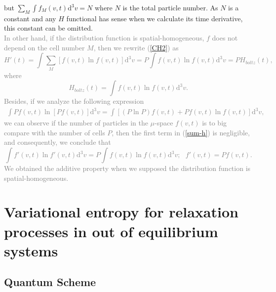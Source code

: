 \documentclass{article}
\begin{document}
  but $\sum_M \int f_M(v,t)\mathrm{d}^3v =N$ where $N$ is the total particle number. As $N$ is a constant and any $H$ functional has sense when we calculate its time derivative, this constant can be omitted. \\
  \textcolor{gray}{In other hand, if the distribution function is spatial-homogeneous, $f$ does not depend on the cell number $M$, then we rewrite (\ref{CH2}) as
  \begin{equation}
      H'(t)=\int \sum_M [f(v,t)\ln f(v,t)] \mathrm{d}^{3}v = P\int  f(v,t) \ln f(v,t) \mathrm{d}^{3}v= P H_{boltz}(t), 
  \end{equation}
  where
  \begin{equation}
      H_{boltz}(t)=\int  f(v,t) \ln f(v,t) \mathrm{d}^{3}v.
  \end{equation}
  Besides, if we analyze the following expression
  \begin{eqnarray}
      \int Pf(v,t) \ln [Pf(v,t)] \mathrm{d}^{3}v = \int [(P\ln P)f(v,t) + Pf(v,t) \ln f(v,t)]\mathrm{d}^{3}v, \label{sum-h}
  \end{eqnarray}
  we can observe if the number of particles in the $\mu$-space $f(v,t)$ is to big compare with the number of cells $P$, then the first term in (\ref{sum-h}) is negligible, and consequently, we conclude that
  \begin{equation}
      \int f'(v,t) \ln f'(v,t) \mathrm{d}^{3}v = P\int f(v,t) \ln f(v,t) \mathrm{d}^{3}v; \ \ \ f'(v,t)= Pf(v,t). \label{aditive-property} 
  \end{equation}
  We obtained the additive property when we supposed the distribution function is spatial-homogeneous.}
  
  
\section{Variational entropy for relaxation processes in out of equilibrium systems}


\subsection{Quantum Scheme}
\end{document}
